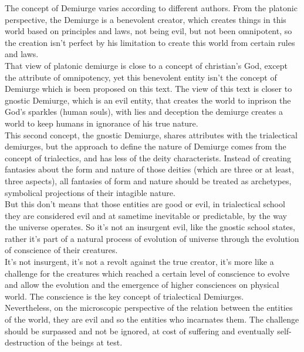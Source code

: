 \documentclass[12pt,a4paper]{article}
\begin{document}
The concept of Demiurge varies according to different authors. From the platonic perspective, the Demiurge is a benevolent creator, which creates things in this world based on principles and laws, not being evil, but not been omnipotent, so the creation isn't perfect by his limitation to create this world from certain rules and laws. \\

That view of platonic demiurge is close to a concept of christian's God, except the attribute of omnipotency, yet this benevolent entity isn't the concept of Demiurge which is been proposed on this text. The view of this text is closer to gnostic Demiurge, which is an evil entity, that creates the world to inprison the God's sparkles (human souls), with lies and deception the demiurge creates a world to keep humans in ignorance of his true nature. \\

This second concept, the gnostic Demiurge, shares attributes with the trialectical demiurges, but the approach to define the nature of Demiurge comes from the concept of trialectics, and has less of the deity characterists. Instead of creating fantasies about the form and nature of those deities (which are three or at least, three aspects), all fantasies of form and nature should be treated as archetypes, symbolical projections of their intagible nature. \\

But this don't means that those entities are good or evil, in trialectical school they are considered evil and at sametime inevitable or predictable, by the way the universe operates. So it's not an insurgent evil, like the gnostic school states, rather it's part of a natural process of evolution of universe through the evolution of conscience of their creatures. \\

It's not insurgent, it's not a revolt against the true creator, it's more like a challenge for the creatures which reached a certain level of conscience to evolve and allow the evolution and the emergence of higher consciences on physical world. The conscience is the key concept of trialectical Demiurges. \\

Nevertheless, on the microscopic perspective of the relation between the entities of the world, they are evil and so the entities who incarnates them. The challenge should be surpassed and not be ignored, at cost of suffering and eventually self-destruction of the beings at test.
\end{document}
